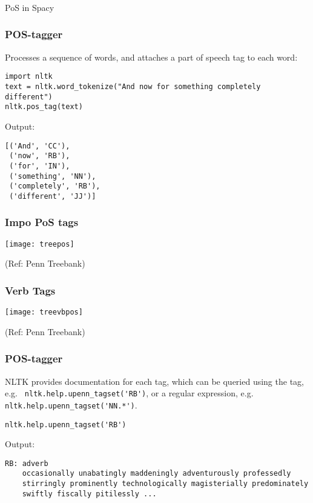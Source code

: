 \begin{frame}[fragile]\frametitle{}

\begin{center}
{\Large PoS in Spacy}
\end{center}
\end{frame}

\begin{frame}[fragile]\frametitle{POS-tagger}
Processes a sequence of words, and attaches a part of speech tag to each word:
\begin{lstlisting}
import nltk
text = nltk.word_tokenize("And now for something completely different")
nltk.pos_tag(text)
\end{lstlisting}
 Output:
\begin{lstlisting}
[('And', 'CC'),
 ('now', 'RB'),
 ('for', 'IN'),
 ('something', 'NN'),
 ('completely', 'RB'),
 ('different', 'JJ')]
\end{lstlisting}
\end{frame}

\begin{frame}[fragile]\frametitle{Impo PoS tags}

\begin{center}
\texttt{[image: treepos]}
\end{center}
  (Ref: Penn Treebank)
\end{frame}

\begin{frame}[fragile]\frametitle{Verb Tags}

\begin{center}
\texttt{[image: treevbpos]}
\end{center}
  (Ref: Penn Treebank)
\end{frame}

\begin{frame}[fragile]\frametitle{POS-tagger}
NLTK provides documentation for each tag, which can be queried using the tag, e.g. \lstinline| nltk.help.upenn_tagset('RB')|, or a regular expression, e.g. \lstinline|nltk.help.upenn_tagset('NN.*')|.
\begin{lstlisting}
nltk.help.upenn_tagset('RB')
\end{lstlisting}
 Output:
\begin{lstlisting}
RB: adverb
    occasionally unabatingly maddeningly adventurously professedly
    stirringly prominently technologically magisterially predominately
    swiftly fiscally pitilessly ...
\end{lstlisting}
\end{frame}


